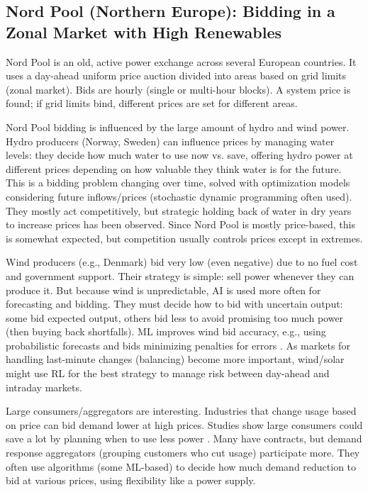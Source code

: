 \documentclass[conference]{IEEEtran}
\begin{document}
\subsection{Nord Pool (Northern Europe): Bidding in a Zonal Market with High Renewables}

Nord Pool is an old, active power exchange across several European countries. It uses a day-ahead uniform price auction divided into areas based on grid limits (zonal market). Bids are hourly (single or multi-hour blocks). A system price is found; if grid limits bind, different prices are set for different areas.

Nord Pool bidding is influenced by the large amount of hydro and wind power. Hydro producers (Norway, Sweden) can influence prices by managing water levels: they decide how much water to use now vs. save, offering hydro power at different prices depending on how valuable they think water is for the future. This is a bidding problem changing over time, solved with optimization models considering future inflows/prices (stochastic dynamic programming often used). They mostly act competitively, but strategic holding back of water in dry years to increase prices has been observed. Since Nord Pool is mostly price-based, this is somewhat expected, but competition usually controls prices except in extremes.

Wind producers (e.g., Denmark) bid very low (even negative) due to no fuel cost and government support. Their strategy is simple: sell power whenever they can produce it. But because wind is unpredictable, AI is used more often for forecasting and bidding. They must decide how to bid with uncertain output: some bid expected output, others bid less to avoid promising too much power (then buying back shortfalls). ML improves wind bid accuracy, e.g., using probabilistic forecasts and bids minimizing penalties for errors \cite{Bitar2012}. As markets for handling last-minute changes (balancing) become more important, wind/solar might use RL for the best strategy to manage risk between day-ahead and intraday markets.

Large consumers/aggregators are interesting. Industries that change usage based on price can bid demand lower at high prices. Studies show large consumers could save a lot by planning when to use less power \cite{Herranz2012}. Many have contracts, but demand response aggregators (grouping customers who cut usage) participate more. They often use algorithms (some ML-based) to decide how much demand reduction to bid at various prices, using flexibility like a power supply.
\end{document}
